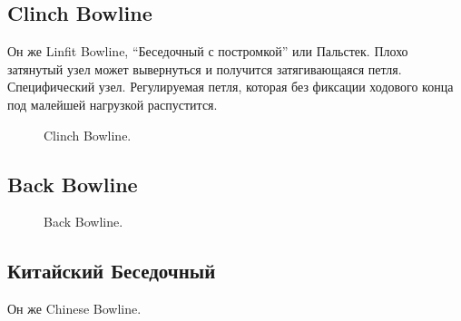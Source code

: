 \subsection{Clinch Bowline}


Он же Linfit Bowline, “Беседочный с постромкой” или Пальстек. Плохо затянутый узел может вывернуться и получится затягивающаяся петля. Специфический узел. Регулируемая петля, которая без фиксации ходового конца под малейшей нагрузкой распустится.

\begin{figure}[H]\centering
	\begin{minipage}{1\linewidth}
		\begin{center}
			\tcbox[enhanced jigsaw,colframe=black,opacityframe=0.5,opacityback=0.5]
			{\centering{}}
		\end{center}
	\end{minipage}
\caption{Clinch Bowline.}
\label{ris:Clinch_Bowline}
\end{figure}

\subsection{Back Bowline}

\begin{figure}[H]\centering
	\begin{minipage}{1\linewidth}
		\begin{center}
			\tcbox[enhanced jigsaw,colframe=black,opacityframe=0.5,opacityback=0.5]
			{\centering{}}
		\end{center}
	\end{minipage}
\caption{Back Bowline.}
\label{ris:Back_Bowline}
\end{figure}

\subsection{Китайский Беседочный}

Он же Chinese Bowline.

\begin{figure}[H]\centering
	\subfloat[Завязывание]{\label{ris:Chinese_Bowline_1}
	\tcbox[enhanced jigsaw,colframe=black,opacityframe=0.5,opacityback=0.5]
		{\centering
			}
		}
\end{figure}

